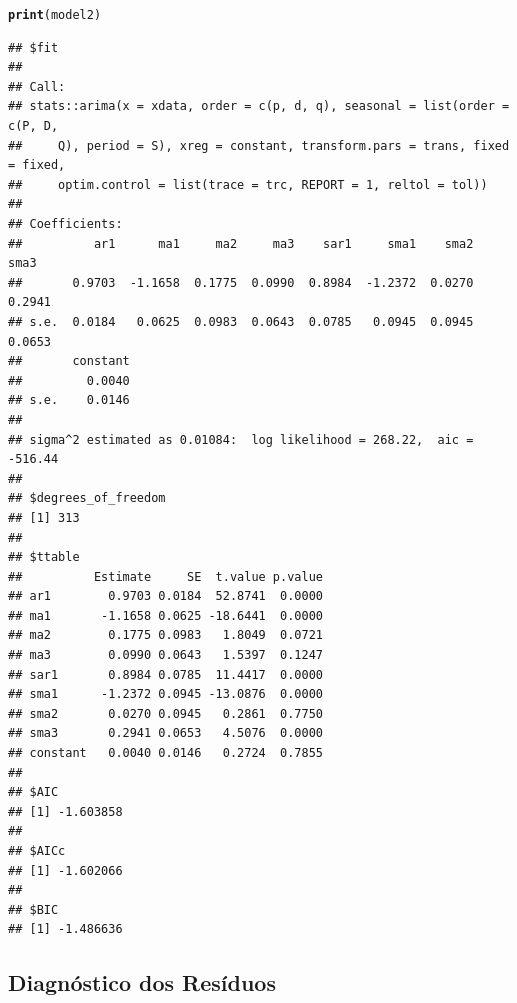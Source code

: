 \documentclass{article}\usepackage[]{graphicx}\usepackage[]{color}
\makeatletter
\newcommand{\hlstd}[1]{\textcolor[rgb]{0.345,0.345,0.345}{#1}}%
\newcommand{\hlkwd}[1]{\textcolor[rgb]{0.737,0.353,0.396}{\textbf{#1}}}%
\newenvironment{kframe}{%
 \def\at@end@of@kframe{}%
 \ifinner\ifhmode%
  \def\at@end@of@kframe{\end{minipage}}%
  \begin{minipage}{\columnwidth}%
 \fi\fi%
 \def\FrameCommand##1{\hskip\@totalleftmargin \hskip-\fboxsep
 \colorbox{shadecolor}{##1}\hskip-\fboxsep
     \hskip-\linewidth \hskip-\@totalleftmargin \hskip\columnwidth}%
 \MakeFramed {\advance\hsize-\width
   \@totalleftmargin\z@ \linewidth\hsize
   \@setminipage}}%
 {\par\unskip\endMakeFramed%
 \at@end@of@kframe}
\newenvironment{knitrout}{}{} %
\makeatother
\begin{document}
\begin{knitrout}
\color{fgcolor}\begin{kframe}
\begin{alltt}
\hlkwd{print}\hlstd{(model2)}
\end{alltt}
\begin{verbatim}
## $fit
## 
## Call:
## stats::arima(x = xdata, order = c(p, d, q), seasonal = list(order = c(P, D, 
##     Q), period = S), xreg = constant, transform.pars = trans, fixed = fixed, 
##     optim.control = list(trace = trc, REPORT = 1, reltol = tol))
## 
## Coefficients:
##          ar1      ma1     ma2     ma3    sar1     sma1    sma2    sma3
##       0.9703  -1.1658  0.1775  0.0990  0.8984  -1.2372  0.0270  0.2941
## s.e.  0.0184   0.0625  0.0983  0.0643  0.0785   0.0945  0.0945  0.0653
##       constant
##         0.0040
## s.e.    0.0146
## 
## sigma^2 estimated as 0.01084:  log likelihood = 268.22,  aic = -516.44
## 
## $degrees_of_freedom
## [1] 313
## 
## $ttable
##          Estimate     SE  t.value p.value
## ar1        0.9703 0.0184  52.8741  0.0000
## ma1       -1.1658 0.0625 -18.6441  0.0000
## ma2        0.1775 0.0983   1.8049  0.0721
## ma3        0.0990 0.0643   1.5397  0.1247
## sar1       0.8984 0.0785  11.4417  0.0000
## sma1      -1.2372 0.0945 -13.0876  0.0000
## sma2       0.0270 0.0945   0.2861  0.7750
## sma3       0.2941 0.0653   4.5076  0.0000
## constant   0.0040 0.0146   0.2724  0.7855
## 
## $AIC
## [1] -1.603858
## 
## $AICc
## [1] -1.602066
## 
## $BIC
## [1] -1.486636
\end{verbatim}
\end{kframe}
\end{knitrout}


    \subsection{Diagnóstico dos Resíduos}
\end{document}
